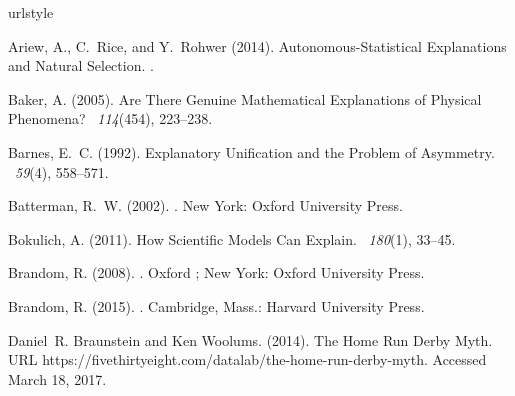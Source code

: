 \documentclass[natbib]{svjour3}                     %
\begin{document}
%
%

\begin{thebibliography}{19}
\providecommand{\natexlab}[1]{#1}
\providecommand{\url}[1]{{#1}}
\providecommand{\urlprefix}{URL }
\expandafter\ifx\csname urlstyle\endcsname\relax
\providecommand{\doi}[1]{DOI~\discretionary{}{}{}#1}\else
\providecommand{\doi}{DOI~\discretionary{}{}{}\begingroup
	\urlstyle{rm}\Url}\fi
\providecommand{\eprint}[2][]{\url{#2}}

Ariew, A., C.~Rice, and Y.~Rohwer (2014).
\newblock Autonomous-Statistical Explanations and Natural Selection.
.

Baker, A. (2005).
\newblock Are There Genuine Mathematical Explanations of Physical Phenomena?
~{\em 114\/}(454), 223--238.

Barnes, E.~C. (1992).
\newblock Explanatory Unification and the Problem of Asymmetry.
~{\em 59\/}(4), 558--571.

Batterman, R.~W. (2002).
.
\newblock New York: Oxford University Press.

Bokulich, A. (2011).
\newblock How Scientific Models Can Explain.
~{\em 180\/}(1), 33--45.

Brandom, R. (2008).
.
\newblock Oxford ; New York: Oxford University Press.

Brandom, R. (2015).
.
\newblock Cambridge, Mass.: Harvard University Press.

Daniel~R. Braunstein and Ken Woolums. (2014).
\newblock The Home Run Derby Myth.
\newblock URL
\url{https://fivethirtyeight.com/datalab/the-home-run-derby-myth}.
\newblock Accessed March 18, 2017.


\end{thebibliography}
\end{document}

